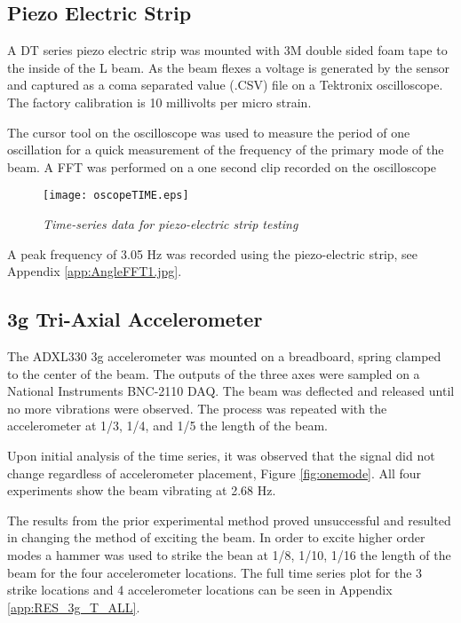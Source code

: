 \subsection{Piezo Electric Strip}
\indent A DT series piezo electric strip was mounted with 3M double sided foam tape to the inside of the L beam. As the beam flexes a voltage is generated by the sensor and captured as a coma separated value (.CSV) file on a Tektronix oscilloscope. The factory calibration is 10 millivolts per micro strain. 

\indent The cursor tool on the oscilloscope was used to measure the period of one oscillation for a quick measurement of the frequency of the primary mode of the beam. A FFT was performed on a one second clip recorded on the oscilloscope

\begin{figure}[H]
\centering
\texttt{[image: oscopeTIME.eps]}
\caption{\textit{Time-series data for piezo-electric strip testing}}
\label{fig:RES_PEST}
\end{figure}

\indent A peak frequency of 3.05 Hz was recorded using the piezo-electric strip, see Appendix \ref{app:AngleFFT1.jpg}.

\subsection{3g Tri-Axial Accelerometer}
\indent The ADXL330 3g accelerometer was mounted on a breadboard, spring clamped to the center of the beam. The outputs of the three axes were sampled on a National Instruments BNC-2110 DAQ. The beam was deflected and released until no more vibrations were observed. The process was repeated with the accelerometer at 1/3, 1/4, and 1/5 the length of the beam.

\indent Upon initial analysis of the time series, it was observed that the signal did not change regardless of accelerometer placement, Figure \ref{fig:onemode}. All four experiments show the beam vibrating at 2.68 Hz. 

\indent The results from the prior experimental method proved unsuccessful and resulted in changing the method of exciting the beam. In order to excite higher order modes a hammer was used to strike the bean at 1/8, 1/10, 1/16 the length of the beam for the four accelerometer locations. The full time series plot for the 3 strike locations and 4 accelerometer locations can be seen in Appendix \ref{app:RES_3g_T_ALL}. 

